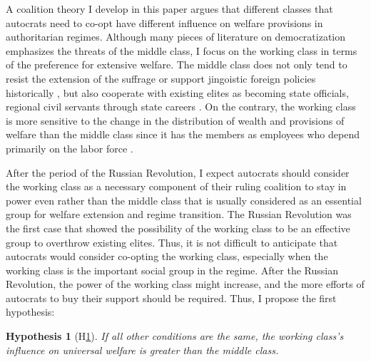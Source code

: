 \documentclass[11pt, notitlepage]{article}
\newtheorem{hyp}{Hypothesis}
\begin{document}
A coalition theory I develop in this paper argues that different classes that autocrats need to co-opt have different influence on welfare provisions in authoritarian regimes. Although many pieces of literature on democratization emphasizes the threats of the middle class, I focus on the working class in terms of the preference for extensive welfare. The middle class does not only tend to resist the extension of the suffrage or support jingoistic foreign policies historically \citep{Lipset1959}, but also cooperate with existing elites as becoming state officials, regional civil servants through state careers \citep{Rosenfeld2017}. On the contrary, the working class is more sensitive to the change in the distribution of wealth and provisions of welfare than the middle class since it has the members as employees who depend primarily on the labor force \citep{Korpi2006}.

After the period of the Russian Revolution, I expect autocrats should consider the working class as a necessary component of their ruling coalition to stay in power even rather than the middle class that is usually considered as an essential group for welfare extension and regime transition. The Russian Revolution was the first case that showed the possibility of the working class to be an effective group to overthrow existing elites. Thus, it is not difficult to anticipate that autocrats would consider co-opting the working class, especially when the working class is the important social group in the regime. After the Russian Revolution, the power of the working class might increase, and the more efforts of autocrats to buy their support should be required. Thus, I propose the first hypothesis:\par

\begin{hyp}[H\ref{hyp:first}] \label{hyp:first}
	If all other conditions are the same, the working class's influence on universal welfare is greater than the middle class.
\end{hyp}
\end{document}
